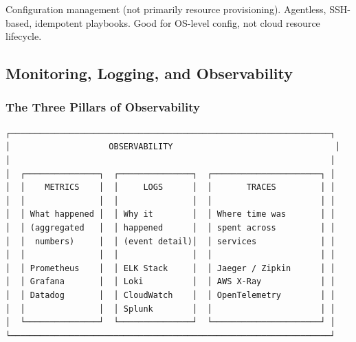 \documentclass[11pt]{article}
\begin{document}
Configuration management (not primarily resource provisioning). Agentless, SSH-based, idempotent playbooks. Good for OS-level config, not cloud resource lifecycle.

\subsection{Monitoring, Logging, and Observability}\label{monitoring-logging-and-observability}

\subsubsection{The Three Pillars of Observability}\label{the-three-pillars-of-observability}

\setcodelang{}

\begin{verbatim}
┌─────────────────────────────────────────────────────────────────┐
│                    OBSERVABILITY                                 │
│                                                                 │
│  ┌───────────────┐  ┌───────────────┐  ┌──────────────────────┐ │
│  │    METRICS    │  │     LOGS      │  │       TRACES         │ │
│  │               │  │               │  │                      │ │
│  │ What happened │  │ Why it        │  │ Where time was       │ │
│  │ (aggregated   │  │ happened      │  │ spent across         │ │
│  │  numbers)     │  │ (event detail)│  │ services             │ │
│  │               │  │               │  │                      │ │
│  │ Prometheus    │  │ ELK Stack     │  │ Jaeger / Zipkin      │ │
│  │ Grafana       │  │ Loki          │  │ AWS X-Ray            │ │
│  │ Datadog       │  │ CloudWatch    │  │ OpenTelemetry        │ │
│  │               │  │ Splunk        │  │                      │ │
│  └───────────────┘  └───────────────┘  └──────────────────────┘ │
└─────────────────────────────────────────────────────────────────┘
\end{verbatim}
\end{document}
